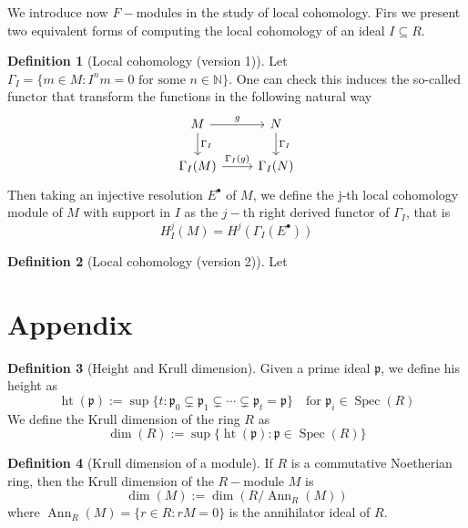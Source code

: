 \documentclass[leqno]{article}
\theoremstyle{definition}
\newtheorem{definition}{Definition}[section]
\DeclareMathOperator{\heigth}{ht}
\DeclareMathOperator{\Spec}{Spec}
\DeclareMathOperator{\Ann}{Ann}
\begin{document}
We introduce now  $F-$modules in the study of local cohomology. Firs we present two equivalent forms of computing the local cohomology of an ideal  $I\subseteq R$.

\begin{definition}[Local cohomology (version 1)] Let $\Gamma_I= \{m\in M : I^nm = 0 \text{ for some }n\in \mathbb{N} \}$. One can check this induces the so-called functor that transform the functions in the following natural way
\[\begin{tikzcd}
	M & N \\
	{\Gamma_I(M)} & {\Gamma_I(N)}
	\arrow["{\Gamma_I}", from=1-1, to=2-1]
	\arrow["{\Gamma_I}", from=1-2, to=2-2]
	\arrow["g", from=1-1, to=1-2]
	\arrow["{\Gamma_I(g)}", from=2-1, to=2-2]
\end{tikzcd}\]
Then taking an injective resolution $E^\bullet$ of $M$, we define the j-th local cohomology module of $M$ with support in  $I$ as the  $j-$th right derived functor of $\Gamma_I $, that is
\[
H_I^j(M)=H^j(\Gamma _I (E^\bullet) )
\] 
\end{definition}

\begin{definition}[Local cohomology (version 2)] Let 

\end{definition}


\section{Appendix}

\begin{definition}[Height and Krull dimension] Given a prime ideal $\mathfrak{p}$, we define his height as
  \[
	\heigth (\mathfrak{p}) := \sup \{t: \mathfrak{p}_0 \subsetneq \mathfrak{p}_1 \subsetneq \cdots \subsetneq  \mathfrak{p}_t = \mathfrak{p} \} \quad \text{for } \mathfrak{p}_i\in \Spec(R)
  \]
We define the Krull dimension of the ring $R$ as
 \[
 \dim (R) :=  \sup \{\heigth (\mathfrak{p}) : \mathfrak{p}\in \Spec(R)\}
\] 
\end{definition}

\begin{definition}[Krull dimension of a module] If  $R$ is a commutative Noetherian ring, then the Krull dimension of the  $R-$module  $M$ is
   \[
\dim(M) := \dim (R / \Ann _R(M))
  \] 
  where $\Ann_R(M) = \{r \in R : rM = 0\}$ is the annihilator ideal of $R$.
\end{definition}
\end{document}
